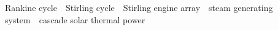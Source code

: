 {\begin{spacing}{1.4}



\end{spacing}
}
\enkeywords
{Rankine cycle\ ~Stirling cycle\ ~Stirling engine array\ ~steam generating system\ ~cascade solar thermal power}